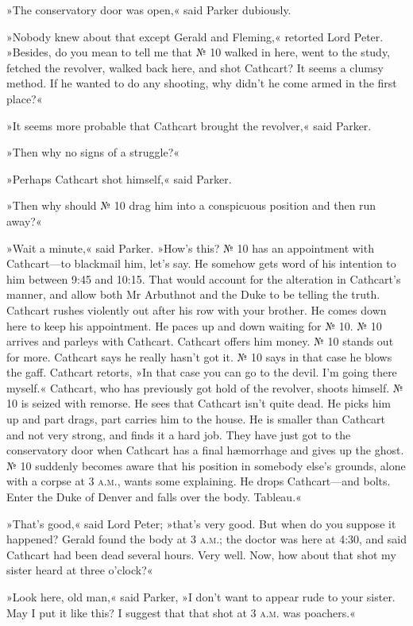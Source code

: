 »The conservatory door was open,« said Parker dubiously.

»Nobody knew about that except Gerald and Fleming,« retorted Lord Peter. »Besides, do you mean to tell me that № 10 walked in here, went to the study, fetched the revolver, walked back here, and shot Cathcart? It seems a clumsy method. If he wanted to do any shooting, why didn't he come armed in the first place?«

»It seems more probable that Cathcart brought the revolver,« said Parker.

»Then why no signs of a struggle?«

»Perhaps Cathcart shot himself,« said Parker.

»Then why should № 10 drag him into a conspicuous position and then run away?«

»Wait a minute,« said Parker. »How's this? № 10 has an appointment with Cathcart\allowbreak---\allowbreak to blackmail him, let's say. He somehow gets word of his intention to him between 9:45 and 10:15. That would account for the alteration in Cathcart's manner, and allow both Mr Arbuthnot and the Duke to be telling the truth. Cathcart rushes violently out after his row with your brother. He comes down here to keep his appointment. He paces up and down waiting for № 10. № 10 arrives and parleys with Cathcart. Cathcart offers him money. № 10 stands out for more. Cathcart says he really hasn't got it. № 10 says in that case he blows the gaff. Cathcart retorts, »In that case you can go to the devil. I'm going there myself.« Cathcart, who has previously got hold of the revolver, shoots himself. № 10 is seized with remorse. He sees that Cathcart isn't quite dead. He picks him up and part drags, part carries him to the house. He is smaller than Cathcart and not very strong, and finds it a hard job. They have just got to the conservatory door when Cathcart has a final hæmorrhage and gives up the ghost. № 10 suddenly becomes aware that his position in somebody else's grounds, alone with a corpse at 3 \textsc{a.m.}, wants some explaining. He drops Cathcart\allowbreak---\allowbreak and bolts. Enter the Duke of Denver and falls over the body. Tableau.«

»That's good,« said Lord Peter; »that's very good. But when do you suppose it happened? Gerald found the body at 3 \textsc{a.m.}; the doctor was here at 4:30, and said Cathcart had been dead several hours. Very well. Now, how about that shot my sister heard at three o'clock?«

»Look here, old man,« said Parker, »I don't want to appear rude to your sister. May I put it like this? I suggest that that shot at 3 \textsc{a.m.} was poachers.«

